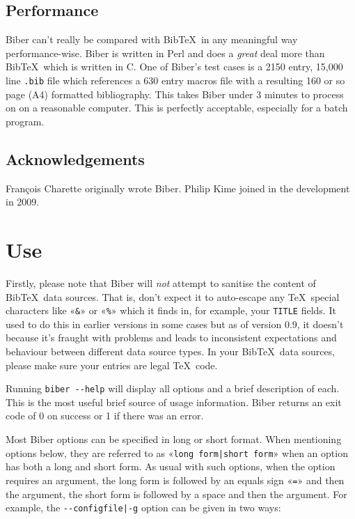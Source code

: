 \documentclass{ltxdockit}
\begin{document}
\subsection{Performance}

Biber can't really be compared with Bib\TeX\ in any meaningful
way performance-wise. Biber is written in Perl and does a
\emph{great} deal more than Bib\TeX\ which is written in C. One of
Biber's test cases is a 2150 entry, 15,000 line \verb+.bib+ file
which references a 630 entry macros file with a resulting 160 or so page (A4)
formatted bibliography. This takes Biber under 3 minutes to process on
on a reasonable computer. This is perfectly acceptable, especially for a
batch program.

\subsection{Acknowledgements}

François Charette originally wrote Biber. Philip Kime joined in
the development in 2009.

\section{Use}

Firstly, please note that Biber will \emph{not} attempt to sanitise
the content of Bib\TeX\ data sources. That is, don't expect it to
auto-escape any \TeX\ special characters like «\verb+&+» or «\verb+%+» which
it finds in, for example, your \verb+TITLE+ fields. It used to do this in
earlier versions in some cases but as of version 0.9, it doesn't because
it's fraught with problems and leads to inconsistent expectations and
behaviour between different data source types. In your Bib\TeX\ data
sources, please make sure your entries are legal \TeX\ code.

Running \verb+biber --help+ will display all options and a brief
description of each. This is the most useful brief source of usage
information. Biber returns an exit code of 0 on success or 1 if
there was an error.

Most Biber options can be specified in long or short format. When
mentioning options below, they are referred to as
«\verb+long form|short form+» when an option has both a long and short
form. As usual with such options, when the option requires an argument, the
long form is followed by an equals sign «\verb+=+» and then the argument,
the short form is followed by a space and then the argument. For example,
the \verb+--configfile|-g+ option can be given in two ways:
\end{document}

